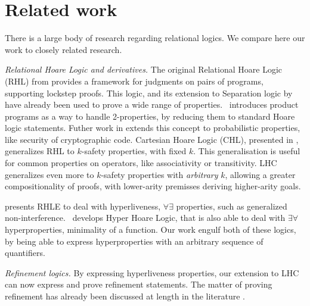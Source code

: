 \section{Related work}
\label{sec:related} 

There is a large body of research regarding relational logics. We compare here our work to closely related research.

\emph{Relational Hoare Logic and derivatives.} The original Relational Hoare Logic (RHL) from \citet{Benton04} provides a framework for judgments on pairs of programs, supporting lockstep proofs. This logic, and its extension to Separation logic by \citet{Yang07} have already been used to prove a wide range of properties.~\citet{BartheCK11} introduces product programs as a way to handle 2-properties, by reducing them to standard Hoare logic statements. Futher work in \citet{BartheKOB13, BartheGHS17} extends this concept to probabilistic properties, like security of cryptographic code. Cartesian Hoare Logic (CHL), presented in \citet{SousaD16}, generalizes RHL to $k$-safety properties, with fixed $k$. This generalisation is useful for common properties on operators, like associativity or transitivity. LHC~\cite{DOsualdo22} generalizes even more to $k$-safety properties with \emph{arbitrary} $k$, allowing a greater compositionality of proofs, with lower-arity premisses deriving higher-arity goals.

\citet{Dickerson22} presents RHLE to deal with hyperliveness, $\forall\exists$ properties, such as generalized non-interference.~\citet{Dardinier23} develops Hyper Hoare Logic, that is also able to deal with $\exists\forall$ hyperproperties, \eg{} minimality of a function. Our work engulf both of these logics, by being able to express hyperproperties with an arbitrary sequence of quantifiers.

\emph{Refinement logics.} By expressing hyperliveness properties, our extension to LHC can now express and prove refinement statements. The matter of proving refinement has already been discussed at length in the literature \eg{} \cite{FruminKB18, LiangFF12}.
